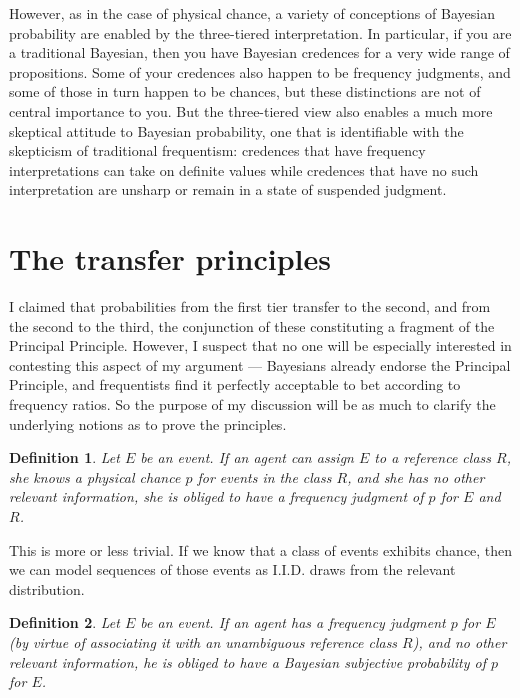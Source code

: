 \documentclass[letterpaper,12pt]{article}
\newtheorem{definition}{Definition}
\begin{document}
However, as in the case of physical chance, a variety of conceptions of Bayesian probability are enabled by the three-tiered interpretation. In particular, if you are a traditional Bayesian, then you have Bayesian credences for a very wide range of propositions. Some of your credences also happen to be frequency judgments, and some of those in turn happen to be chances, but these distinctions are not of central importance to you. But the three-tiered view also enables a much more skeptical attitude to Bayesian probability, one that is identifiable with the skepticism of traditional frequentism: credences that have frequency interpretations can take on definite values while credences that have no such interpretation are unsharp or remain in a state of suspended judgment.


\section{The transfer principles}
I claimed that probabilities from the first tier transfer to the second, and from the second to the third, the conjunction of these constituting a fragment of the Principal Principle. However, I suspect that no one will be especially interested in contesting this aspect of my argument --- Bayesians already endorse the Principal Principle, and frequentists find it perfectly acceptable to bet according to frequency ratios. So the purpose of my discussion will be as much to clarify the underlying notions as to prove the principles.

\begin{definition}
Let $E$ be an event. If an agent can assign $E$ to a reference class $R$, she knows a physical chance $p$ for events in the class $R$, and she has no other relevant information, she is obliged to have a frequency judgment of $p$ for $E$ and $R$.
\end{definition}

This is more or less trivial. If we know that a class of events exhibits chance, then we can model sequences of those events as I.I.D. draws from the relevant distribution.

\begin{definition}
Let $E$ be an event. If an agent has a frequency judgment $p$ for $E$ (by virtue of associating it with an unambiguous reference class $R$), and no other relevant information, he is obliged to have a Bayesian subjective probability of $p$ for $E$.
\end{definition}
\end{document}
